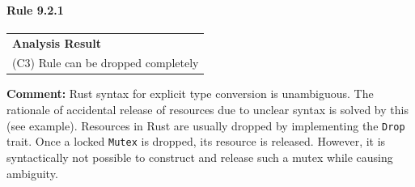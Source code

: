 \paragraph{Rule 9.2.1}
\begin{longtable}{p{13cm}}
\textbf{Analysis Result} \\
(C3) Rule can be dropped completely \\
\end{longtable}
\textbf{Comment:} Rust syntax for explicit type conversion is unambiguous. The rationale of accidental release of resources due to unclear syntax is solved by this (see example). Resources in Rust are usually dropped by implementing the \texttt{Drop} trait. Once a locked \texttt{Mutex} is dropped, its resource is released. However, it is syntactically not possible to construct and release such a mutex while causing ambiguity. \\


